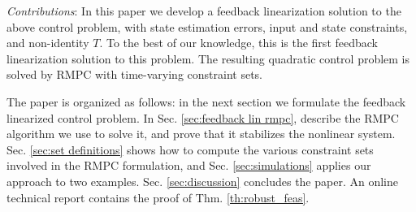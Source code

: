 \emph{Contributions}: In this paper we develop a feedback linearization solution to the above control problem, with state estimation errors, input and state constraints, and non-identity $T$.
To the best of our knowledge, this is the first feedback linearization solution to this problem.
The resulting quadratic control problem is solved by RMPC with time-varying constraint sets.

The paper is organized as follows: in the next section we formulate the feedback linearized control problem. In Sec. \ref{sec:feedback lin rmpc}, describe the RMPC algorithm we use to solve it, and prove that it stabilizes the nonlinear system. 
Sec. \ref{sec:set definitions} shows how to compute the various constraint sets involved in the RMPC formulation, and Sec. \ref{sec:simulations} applies our approach to two examples. Sec. \ref{sec:discussion} concludes the paper. 
An online technical report \cite{PantAM16_RMPC} contains the proof of Thm. \ref{th:robust_feas}.